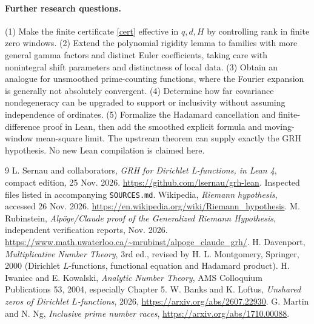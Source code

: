 \documentclass[11pt]{article}
\theoremstyle{remark}\newtheorem{remark}[theorem]{Remark}
\begin{document}
\paragraph{Further research questions.} (1) Make the finite certificate \eqref{cert} effective in $q,d,H$ by controlling rank in finite zero windows. (2) Extend the polynomial rigidity lemma to families with more general gamma factors and distinct Euler coefficients, taking care with nonintegral shift parameters and distinctness of local data. (3) Obtain an analogue for unsmoothed prime-counting functions, where the Fourier expansion is generally not absolutely convergent. (4) Determine how far covariance nondegeneracy can be upgraded to support or inclusivity without assuming independence of ordinates. (5) Formalize the Hadamard cancellation and finite-difference proof in Lean, then add the smoothed explicit formula and moving-window mean-square limit. The upstream theorem can supply exactly the GRH hypothesis. No new Lean compilation is claimed here.

\begin{thebibliography}{9}\small
{} L. Sernau and collaborators, \emph{GRH for Dirichlet L-functions, in Lean 4}, compact edition, 25 Nov. 2026. \url{https://github.com/lsernau/grh-lean}. Inspected files listed in accompanying \texttt{SOURCES.md}.
 Wikipedia, \emph{Riemann hypothesis}, accessed 26 Nov. 2026. \url{https://en.wikipedia.org/wiki/Riemann_hypothesis}.
 M. Rubinstein, \emph{Alp\"oge/Claude proof of the Generalized Riemann Hypothesis}, independent verification reports, Nov. 2026. \url{https://www.math.uwaterloo.ca/~mrubinst/alpoge_claude_grh/}.
 H. Davenport, \emph{Multiplicative Number Theory}, 3rd ed., revised by H. L. Montgomery, Springer, 2000 (Dirichlet $L$-functions, functional equation and Hadamard product).
 H. Iwaniec and E. Kowalski, \emph{Analytic Number Theory}, AMS Colloquium Publications 53, 2004, especially Chapter 5.
 W. Banks and K. Loftus, \emph{Unshared zeros of Dirichlet $L$-functions}, 2026, \url{https://arxiv.org/abs/2607.22930}.
 G. Martin and N. Ng, \emph{Inclusive prime number races}, \url{https://arxiv.org/abs/1710.00088}.
\end{thebibliography}
\end{document}
